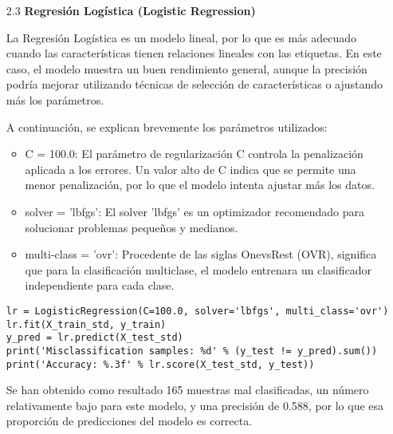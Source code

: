 \documentclass{article}
\begin{document}
\begin{itemize}

\item[2.3]  {\bf Regresi\'on Log\'istica (Logistic Regression)}

La Regresi\'on Log\'istica es un modelo lineal, por lo que es m\'as adecuado cuando las caracter\'isticas tienen relaciones lineales con las etiquetas. En este caso, el modelo muestra un buen rendimiento general, aunque la precisi\'on podr\'ia mejorar utilizando t\'ecnicas de selecci\'on de caracter\'isticas o ajustando m\'as los par\'ametros.

A continuaci\'on, se explican brevemente los par\'ametros utilizados:

\begin{itemize}

\item
C = 100.0: El par\'ametro de regularizaci\'on C controla la penalizaci\'on aplicada a los errores. Un valor alto de C indica que se permite una menor penalizaci\'on, por lo que el modelo intenta ajustar m\'as los datos.

\item
solver = 'lbfgs': El solver 'lbfgs' es un optimizador recomendado para solucionar problemas pequeños y medianos.

\item
multi-class = 'ovr': Procedente de las siglas OnevsRest (OVR), significa que para la
clasificaci\'on multiclase, el modelo entrenara un clasificador independiente para cada clase.

\end{itemize}

\begin{tcolorbox}[width=14cm]
\begin{scriptsize}
\begin{verbatim}
lr = LogisticRegression(C=100.0, solver='lbfgs', multi_class='ovr')
lr.fit(X_train_std, y_train)
y_pred = lr.predict(X_test_std)
print('Misclassification samples: %d' % (y_test != y_pred).sum())
print('Accuracy: %.3f' % lr.score(X_test_std, y_test))
\end{verbatim}
\end{scriptsize}
\end{tcolorbox}

Se han obtenido como resultado 165 muestras mal clasificadas, un n\'umero relativamente bajo para este modelo, y una precisi\'on de 0.588, por lo que esa proporci\'on de  predicciones del modelo es correcta.

\end{itemize}
\end{document}
